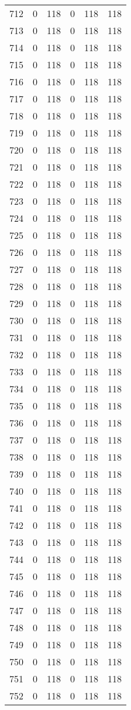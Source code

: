 \documentclass[a4paper]{ctexart}
\begin{document}
\begin{longtable}{p{1cm}|p{2cm}|p{2cm}|p{2cm}|P{2cm}|p{2cm}}
		712&0&118&0&118&118\\
		713&0&118&0&118&118\\
		714&0&118&0&118&118\\
		715&0&118&0&118&118\\
		716&0&118&0&118&118\\
		717&0&118&0&118&118\\
		718&0&118&0&118&118\\
		719&0&118&0&118&118\\
		720&0&118&0&118&118\\
		721&0&118&0&118&118\\
		722&0&118&0&118&118\\
		723&0&118&0&118&118\\
		724&0&118&0&118&118\\
		725&0&118&0&118&118\\
		726&0&118&0&118&118\\
		727&0&118&0&118&118\\
		728&0&118&0&118&118\\
		729&0&118&0&118&118\\
		730&0&118&0&118&118\\
		731&0&118&0&118&118\\
		732&0&118&0&118&118\\
		733&0&118&0&118&118\\
		734&0&118&0&118&118\\
		735&0&118&0&118&118\\
		736&0&118&0&118&118\\
		737&0&118&0&118&118\\
		738&0&118&0&118&118\\
		739&0&118&0&118&118\\
		740&0&118&0&118&118\\
		741&0&118&0&118&118\\
		742&0&118&0&118&118\\
		743&0&118&0&118&118\\
		744&0&118&0&118&118\\
		745&0&118&0&118&118\\
		746&0&118&0&118&118\\
		747&0&118&0&118&118\\
		748&0&118&0&118&118\\
		749&0&118&0&118&118\\
		750&0&118&0&118&118\\
		751&0&118&0&118&118\\
		752&0&118&0&118&118\\

\end{longtable}
\end{document}

